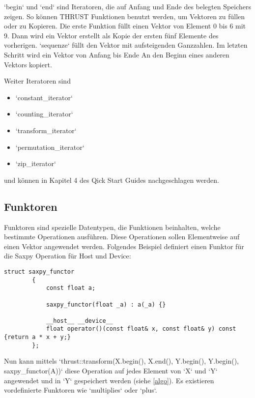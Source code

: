 		\li`begin` und \li`end` sind Iteratoren, die auf Anfang und Ende des belegten Speichers zeigen. So können THRUST Funktionen benutzt werden, um Vektoren zu füllen oder zu Kopieren. Die erste Funktion füllt einen Vektor von Element 0 bis 6	mit 9. Dann wird ein Vektor erstellt als Kopie der ersten fünf Elemente des vorherigen. \li`sequenze` füllt den Vektor mit aufsteigenden Ganzzahlen. Im letzten Schritt wird ein Vektor von Anfang bis Ende An den Beginn eines anderen Vektors kopiert.
		
		Weiter Iteratoren sind
		\begin{itemize}
		\item \li`constant_iterator`
		\item \li`counting_iterator`
		\item \li`transform_iterator`
		\item \li`permutation_iterator`
		\item \li`zip_iterator`
		\end{itemize}
		und können in Kapitel 4 des Qick Start Guides nachgeschlagen werden. \autocite{thrustQSG}
		
		\subsection{Funktoren}\label{funk}
		Funktoren sind spezielle Datentypen, die Funktionen beinhalten, welche bestimmte Operationen ausführen. Diese Operationen sollen Elementweise auf einen Vektor angewendet werden. Folgendes Beispiel definiert einen Funktor für die Saxpy Operation für Host und Device:
		\begin{lstlisting}[caption=THRUST Funktoren]
		struct saxpy_functor
		{
			const float a;

			saxpy_functor(float _a) : a(_a) {}

			__host__ __device__
			float operator()(const float& x, const float& y) const {return a * x + y;}
		};
		\end{lstlisting}
		
		Nun kann mittels \li`thrust::transform(X.begin(), X.end(), Y.begin(), Y.begin(), saxpy_functor(A))` diese Operation auf jedes Element von \li`X` und \li`Y` angewendet und in \li`Y` gespeichert werden (siehe \ref{algo}).	Es existieren vordefinierte Funktoren wie \li`multiplies` oder \li`plus`.
		
